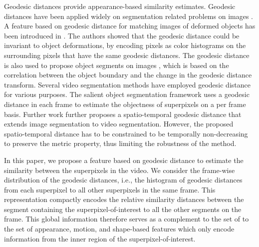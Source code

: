 \documentclass[runningheads]{llncs}
\begin{document}
Geodesic distances provide appearance-based similarity estimates. Geodesic distances have been applied widely on segmentation related problems on images \cite{Krähenbühl2014,geohis,Bai:4408931}. A feature based on geodesic distance for matching images of deformed objects has been introduced in \cite{geohis}. The authors showed that the geodesic distance could be invariant to object deformations, by encoding pixels as color histograms on the surrounding pixels that have the same geodesic distances. The geodesic distance is also used to propose object segments on images \cite{Krähenbühl2014}, which is based on the correlation between the object boundary and the change in the geodesic distance transform. 
Several video segmentation methods have employed geodesic distance for various purposes.
The salient object segmentation framework uses a geodesic distance in each frame to estimate the objectness of superpixels \cite{Wang:7298961} on a per frame basis. %
Further work further proposes a  spatio-temporal geodesic distance \cite{Bai:4408931} that extends image segmentation to video segmentation. However, the proposed spatio-temporal distance has to be constrained to be temporally non-decreasing to preserve the metric property, thus limiting the robustness of the method.

In this paper, we propose a feature based on geodesic distance to estimate the similarity between the superpixels in the video. We consider the frame-wise distribution of the geodesic distances, i.e., the histogram of geodesic distances from each superpixel to all other superpixels in the same frame. This representation compactly encodes the relative similarity distances between the segment containing the superpixel-of-interest to all the  other segments on the frame. This global information therefore serves as a complement to the set of to the set of appearance, motion, and shape-based features which only encode information from the inner region of the superpixel-of-interest.
\end{document}
